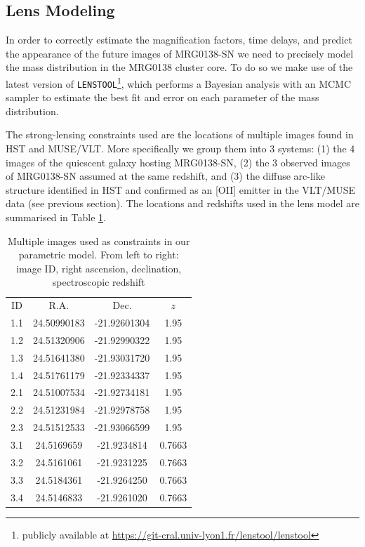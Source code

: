 \documentclass[12pt,dvipsnames]{article}
\def\lenstool{{\tt LENSTOOL}\xspace}
\begin{document}
\subsection*{Lens Modeling}

In order to correctly estimate the magnification factors, time delays, and predict the appearance of the future images of MRG0138-SN we need to precisely model the mass distribution in the MRG0138 cluster core. To do so we make use of the latest version of \lenstool \cite{jullo_bayesian_2007}\footnote{publicly available at \url{ https://git-cral.univ-lyon1.fr/lenstool/lenstool}}, which performs a Bayesian analysis with an MCMC sampler to estimate the best fit and error on each parameter of the mass distribution. 

The strong-lensing constraints used are the locations of multiple images found in HST and MUSE/VLT. More specifically we group them into 3 systems: (1) the 4 images of the quiescent galaxy hosting MRG0138-SN, (2) the 3 observed images of MRG0138-SN assumed at the same redshift, and (3) the diffuse arc-like structure identified in HST and confirmed as an [OII] emitter in the VLT/MUSE data (see previous section). The locations and redshifts used in the lens model are summarised in Table \ref{tab:mulimages}.

\begin{table}[]
    \centering
    \begin{tabular}{c|c|c|c}
     ID &   R.A. & Dec. & $z$ \\
1.1 & 24.50990183 & -21.92601304 & 1.95 \\
1.2 & 24.51320906 & -21.92990322 & 1.95 \\
1.3 & 24.51641380 & -21.93031720 & 1.95 \\
1.4 & 24.51761179 & -21.92334337 & 1.95 \\
2.1 & 24.51007534 & -21.92734181 & 1.95 \\
2.2 & 24.51231984 & -21.92978758 & 1.95 \\
2.3 & 24.51512533 & -21.93066599 & 1.95 \\
3.1 & 24.5169659 & -21.9234814 & 0.7663 \\
3.2 & 24.5161061 & -21.9231225 & 0.7663 \\
3.3 & 24.5184361 & -21.9264250 & 0.7663 \\
3.4 & 24.5146833 & -21.9261020 & 0.7663 \\
    \end{tabular}
    \caption{Multiple images used as constraints in our parametric model. From left to right: image ID, right ascension, declination, spectroscopic redshift}
    \label{tab:mulimages}
\end{table}
\end{document}
